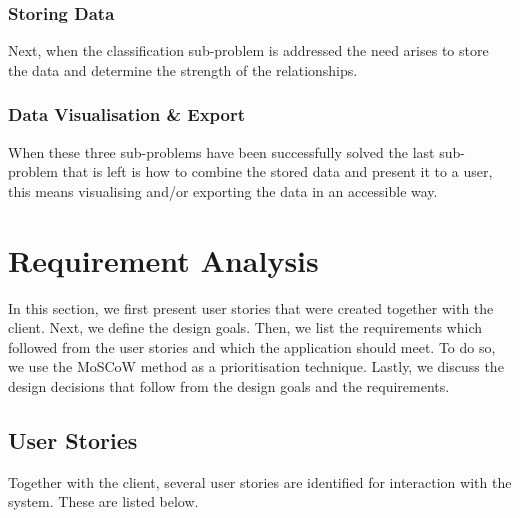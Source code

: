 \subsubsection{Storing Data}
Next, when the classification sub-problem is addressed the need arises to store the data and determine the strength of the relationships. 

\subsubsection{Data Visualisation \& Export}
When these three sub-problems have been successfully solved the last sub-problem that is left is how to combine the stored data and present it to a user, this means visualising and/or exporting the data in an accessible way.

\section{Requirement Analysis}\label{sec:reqs-analysis}
In this section, we first present user stories that were created together with the client. Next, we define the design goals. Then, we list the requirements which followed from the user stories and which the application should meet. To do so, we use the MoSCoW method\cite{clegg1994case} as a prioritisation technique. Lastly, we discuss the design decisions that follow from the design goals and the requirements.

\subsection{User Stories}
Together with the client, several user stories are identified for interaction with the system. These are listed below.

